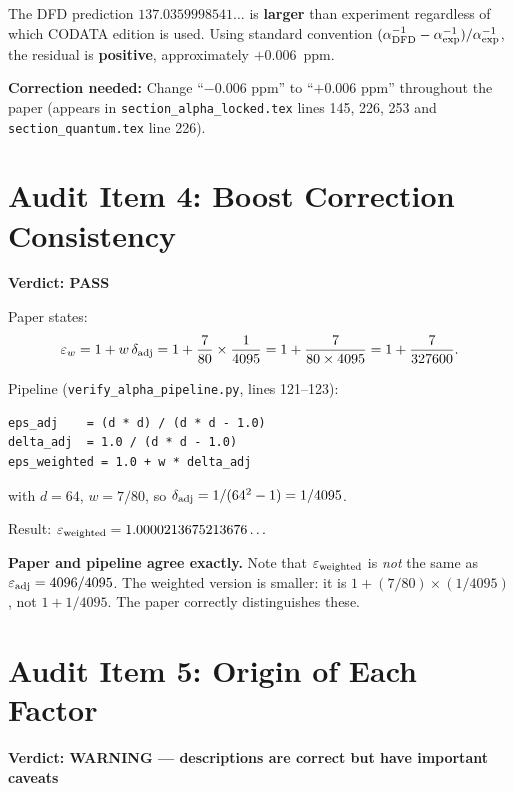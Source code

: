 \documentclass[11pt]{article}
\newcommand{\PASS}{\textcolor{pass}{\textbf{PASS}}}
\newcommand{\WARN}{\textcolor{warn}{\textbf{WARNING}}}
\begin{document}
The DFD prediction $137.0359998541\ldots$ is \textbf{larger} than experiment
regardless of which CODATA edition is used. Using standard convention
$(\alpha^{-1}_{\rm DFD} - \alpha^{-1}_{\rm exp})/\alpha^{-1}_{\rm exp}$,
the residual is \textbf{positive}, approximately $+0.006$~ppm.

\textbf{Correction needed:} Change ``$-0.006$ ppm'' to ``$+0.006$ ppm''
throughout the paper (appears in \texttt{section\_alpha\_locked.tex}
lines 145, 226, 253 and \texttt{section\_quantum.tex} line 226).

\section{Audit Item 4: Boost Correction Consistency}

\textbf{Verdict: \PASS}

\medskip
\noindent Paper states:
\[
\varepsilon_w = 1 + w\,\delta_{\rm adj}
= 1 + \frac{7}{80} \times \frac{1}{4095}
= 1 + \frac{7}{80 \times 4095}
= 1 + \frac{7}{327600}.
\]

Pipeline (\texttt{verify\_alpha\_pipeline.py}, lines 121--123):
\begin{verbatim}
eps_adj    = (d * d) / (d * d - 1.0)
delta_adj  = 1.0 / (d * d - 1.0)
eps_weighted = 1.0 + w * delta_adj
\end{verbatim}
with $d = 64$, $w = 7/80$, so $\delta_{\rm adj} = 1/(64^2-1) = 1/4095$.

Result: $\varepsilon_{\rm weighted} = 1.0000213675213676\ldots$

\textbf{Paper and pipeline agree exactly.} Note that $\varepsilon_{\rm weighted}$
is \emph{not} the same as $\varepsilon_{\rm adj} = 4096/4095$. The weighted
version is smaller: it is $1 + (7/80) \times (1/4095)$, not $1 + 1/4095$.
The paper correctly distinguishes these.

\section{Audit Item 5: Origin of Each Factor}

\textbf{Verdict: \WARN{} --- descriptions are correct but have important caveats}
\end{document}
